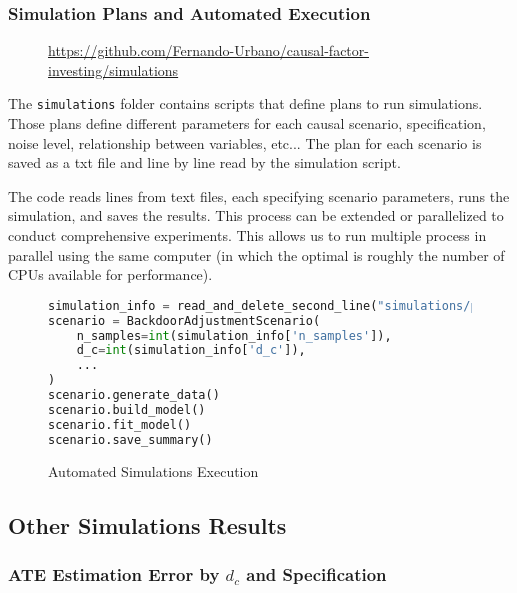 \documentclass{article}
\numberwithin{equation}{section}
\begin{document}
\subsubsection{Simulation Plans and Automated Execution}

\begin{figure}[H]
    \centering
    \url{https://github.com/Fernando-Urbano/causal-factor-investing/simulations}
\end{figure}

The \texttt{simulations} folder contains scripts that define plans to run simulations. Those plans define different parameters for each causal scenario, specification, noise level, relationship between variables, etc... The plan for each scenario is saved as a txt file and line by line read by the simulation script.

The code reads lines from text files, each specifying scenario parameters, runs the simulation, and saves the results. This process can be extended or parallelized to conduct comprehensive experiments. This allows us to run multiple process in parallel using the same computer (in which the optimal is roughly the number of CPUs available for performance).

\begin{figure}[H]
\begin{lstlisting}[language=python]
simulation_info = read_and_delete_second_line("simulations/plans/backdoor_simulation_plan.txt")
scenario = BackdoorAdjustmentScenario(
    n_samples=int(simulation_info['n_samples']),
    d_c=int(simulation_info['d_c']),
    ...
)
scenario.generate_data()
scenario.build_model()
scenario.fit_model()
scenario.save_summary()
\end{lstlisting}
\caption{Automated Simulations Execution}
\end{figure}

\newpage

\subsection{Other Simulations Results}

\subsubsection{ATE Estimation Error by $d_c$ and Specification}
\end{document}
